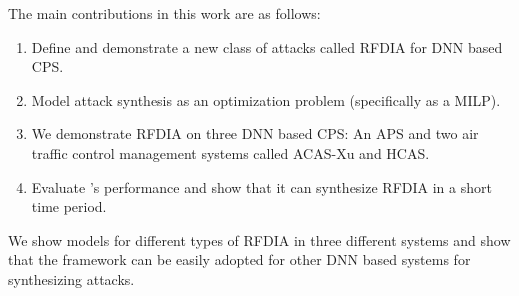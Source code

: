 The main contributions in this work are as follows:

\begin{enumerate}
	\item Define and demonstrate a new class of attacks called \ac{RFDIA} for \ac{DNN} based \ac{CPS}. 
	\item Model attack synthesis as an optimization problem (specifically as a \ac{MILP}). 
	\item We demonstrate \ac{RFDIA} on three \ac{DNN} based \ac{CPS}:  An \ac{APS} and two air traffic control management systems called \ac{ACAS-Xu} and \ac{HCAS}.
	\item Evaluate \tool's performance  and show that it can synthesize \ac{RFDIA} in a short time period.  
\end{enumerate}
 
We show models for different types of RFDIA in three different systems and show that the framework can be easily adopted for other \ac{DNN} based systems for synthesizing attacks. 






